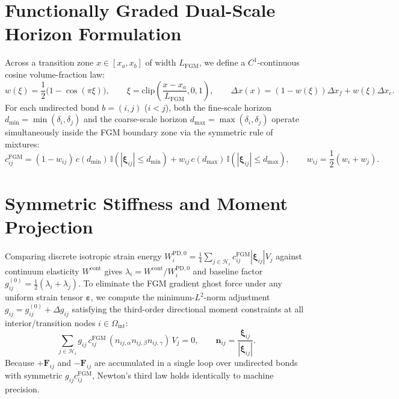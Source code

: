 \documentclass[11pt,a4paper]{article}
\begin{document}
\section{Functionally Graded Dual-Scale Horizon Formulation}
Across a transition zone $x \in [x_a, x_b]$ of width $L_{\mathrm{FGM}}$, we define a $C^1$-continuous cosine volume-fraction law:
\begin{equation}
  w(\xi) = \frac{1}{2}\bigl(1 - \cos(\pi\xi)\bigr), \qquad \xi = \mathrm{clip}\!\left(\frac{x - x_a}{L_{\mathrm{FGM}}}, 0, 1\right), \qquad \Delta x(x) = (1 - w(\xi))\Delta x_f + w(\xi)\Delta x_c.
\end{equation}
For each undirected bond $b=(i,j)$ ($i<j$), both the fine-scale horizon $d_{\min}=\min(\delta_i,\delta_j)$ and the coarse-scale horizon $d_{\max}=\max(\delta_i,\delta_j)$ operate simultaneously inside the FGM boundary zone via the symmetric rule of mixtures:
\begin{equation}
  c_{ij}^{\mathrm{FGM}} = (1 - w_{ij})\,c(d_{\min})\,\mathbb{I}(|\boldsymbol{\xi}_{ij}|\le d_{\min}) + w_{ij}\,c(d_{\max})\,\mathbb{I}(|\boldsymbol{\xi}_{ij}|\le d_{\max}), \qquad w_{ij} = \frac{1}{2}(w_i + w_j).
\end{equation}

\section{Symmetric Stiffness and Moment Projection}
Comparing discrete isotropic strain energy $W_i^{\mathrm{PD},0} = \frac{1}{4}\sum_{j\in\mathcal{H}_i} c_{ij}^{\mathrm{FGM}}|\boldsymbol{\xi}_{ij}|V_j$ against continuum elasticity $W^{\mathrm{cont}}$ gives $\lambda_i = W^{\mathrm{cont}}/W_i^{\mathrm{PD},0}$ and baseline factor $g_{ij}^{(0)} = \frac{1}{2}(\lambda_i + \lambda_j)$. To eliminate the FGM gradient ghost force under any uniform strain tensor $\boldsymbol{\varepsilon}$, we compute the minimum-$L^2$-norm adjustment $g_{ij} = g_{ij}^{(0)} + \Delta g_{ij}$ satisfying the third-order directional moment constraints at all interior/transition nodes $i \in \Omega_{\mathrm{int}}$:
\begin{equation}
  \sum_{j\in\mathcal{H}_i} g_{ij}\,c_{ij}^{\mathrm{FGM}}\,(n_{ij,\alpha}n_{ij,\beta}n_{ij,\gamma})\,V_j = 0, \qquad \mathbf{n}_{ij} = \frac{\boldsymbol{\xi}_{ij}}{|\boldsymbol{\xi}_{ij}|}.
\end{equation}
Because $+\mathbf{F}_{ij}$ and $-\mathbf{F}_{ij}$ are accumulated in a single loop over undirected bonds with symmetric $g_{ij}c_{ij}^{\mathrm{FGM}}$, Newton's third law holds identically to machine precision.
\end{document}
